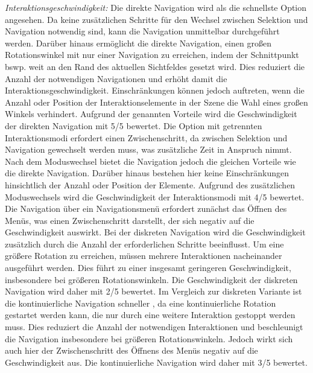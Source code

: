 \textit{Interaktionsgeschwindigkeit:}
Die direkte Navigation wird als die schnellste Option angesehen. Da keine zusätzlichen Schritte für den Wechsel zwischen Selektion und Navigation notwendig sind, kann die Navigation unmittelbar durchgeführt werden. Darüber hinaus ermöglicht die direkte Navigation, einen großen Rotationswinkel mit nur einer Navigation zu erreichen, indem der Schnittpunkt bswp. weit an den Rand des aktuellen Sichtfeldes gesetzt wird. Dies reduziert die Anzahl der notwendigen Navigationen und erhöht damit die Interaktionsgeschwindigkeit. Einschränkungen können jedoch auftreten, wenn die Anzahl oder Position der Interaktionselemente in der Szene die Wahl eines großen Winkels verhindert. Aufgrund der genannten Vorteile wird die Geschwindigkeit der direkten Navigation mit 5/5 bewertet. Die Option mit getrennten Interaktionsmodi erfordert einen Zwischenschritt, da zwischen Selektion und Navigation gewechselt werden muss, was zusätzliche Zeit in Anspruch nimmt. Nach dem Moduswechsel bietet die Navigation jedoch die gleichen Vorteile wie die direkte Navigation. Darüber hinaus bestehen hier keine Einschränkungen hinsichtlich der Anzahl oder Position der Elemente. Aufgrund des zusätzlichen Moduswechsels wird die Geschwindigkeit der Interaktionsmodi mit 4/5 bewertet. 
Die Navigation über ein Navigationsmenü erfordert zunächst das Öffnen des Menüs, was einen Zwischenschritt darstellt, der sich negativ auf die Geschwindigkeit auswirkt. Bei der diskreten Navigation wird die Geschwindigkeit zusätzlich durch die Anzahl der erforderlichen Schritte beeinflusst. Um eine größere Rotation zu erreichen, müssen mehrere Interaktionen nacheinander ausgeführt werden. Dies führt zu einer insgesamt geringeren Geschwindigkeit, insbesondere bei größeren Rotationswinkeln. Die Geschwindigkeit der diskreten Navigation wird daher mit 2/5 bewertet. Im Vergleich zur diskreten Variante ist die kontinuierliche Navigation schneller \citep{10.1145/2159365.2159386}, da eine kontinuierliche Rotation gestartet werden kann, die nur durch eine weitere Interaktion gestoppt werden muss. Dies reduziert die Anzahl der notwendigen Interaktionen und beschleunigt die Navigation insbesondere bei größeren Rotationswinkeln. Jedoch wirkt sich auch hier der Zwischenschritt des Öffnens des Menüs negativ auf die Geschwindigkeit aus. Die kontinuierliche Navigation wird daher mit 3/5 bewertet.


